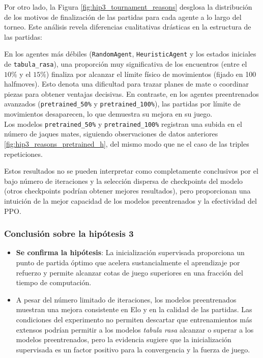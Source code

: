 \documentclass[12pt, a4paper]{article}
\begin{document}
Por otro lado, la Figura \ref{fig:hip3_tournament_reasons} desglosa la distribución de los motivos de finalización de las partidas para cada agente a lo largo del torneo. Este análisis revela diferencias cualitativas drásticas en la estructura de las partidas:

En los agentes más débiles (\texttt{RandomAgent}, \texttt{HeuristicAgent} y los estados iniciales de \texttt{tabula\_rasa}), una proporción muy significativa de los encuentros (entre el $10\%$ y el $15\%$) finaliza por alcanzar el límite físico de movimientos (fijado en 100 halfmoves). Esto denota una dificultad para trazar planes de mate o coordinar piezas para obtener ventajas decisivas. En contraste, en los agentes preentrenados avanzados (\texttt{pretrained\_50\%} y \texttt{pretrained\_100\%}), las partidas por límite de movimientos desaparecen, lo que demuestra su mejora en su juego. \\
Los modelos \texttt{pretrained\_50\%} y \texttt{pretrained\_100\%} registran una subida en el número de jaques mates, siguiendo observaciones de datos anteriores \ref{fig:hip3_reasons_pretrained_h}, del mismo modo que ne el caso de las triples repeticiones.

Estos resultados no se pueden interpretar como completamente conclusivos por el bajo número de iteraciones y la selección dispersa de checkpoints del modelo (otros checkpoints podrían obtener mejores resultados), pero proporcionan una intuición de la mejor capacidad de los modelos preentrenados y la efectividad del PPO.

\subsubsection{Conclusión sobre la hipótesis 3}
\begin{itemize}
    \item \textbf{Se confirma la hipótesis}: La inicialización supervisada proporciona un punto de partida óptimo que acelera sustancialmente el aprendizaje por refuerzo y permite alcanzar cotas de juego superiores en una fracción del tiempo de computación.
    \item A pesar del número limitado de iteraciones, los modelos preentrenados muestran una mejora consistente en Elo y en la calidad de las partidas. Las condiciones del experimento no permiten descartar que entrenamientos más extensos podrían permitir a los modelos \textit{tabula rasa} alcanzar o superar a los modelos preentrenados, pero la evidencia sugiere que la inicialización supervisada es un factor positivo para la convergencia y la fuerza de juego.
\end{itemize}
\end{document}
